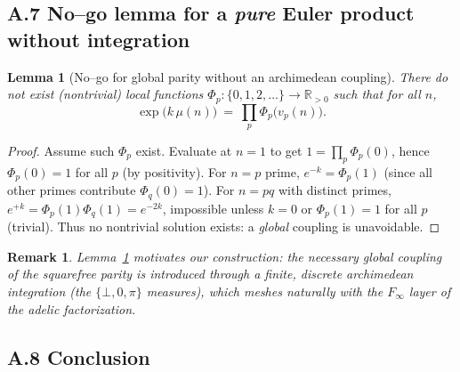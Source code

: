 \documentclass[12pt]{article}
\newtheorem{lemma}[theorem]{Lemma}
\newtheorem{remark}[theorem]{Remark}
\numberwithin{equation}{section}
\begin{document}
\bigskip
\subsection*{A.7 \; No–go lemma for a \emph{pure} Euler product without integration}

\begin{lemma}[No–go for global parity without an archimedean coupling]\label{lem:nogo}
There do not exist (nontrivial) local functions $\Phi_p:\{0,1,2,\ldots\}\to\mathbb{R}_{>0}$ such that for all $n$,
\[
\exp\!\big(k\,\mu(n)\big)\ =\ \prod_{p}\Phi_p\big(v_p(n)\big).
\]
\end{lemma}

\begin{proof}
Assume such $\Phi_p$ exist. Evaluate at $n=1$ to get $1=\prod_p \Phi_p(0)$, hence $\Phi_p(0)=1$ for all $p$ (by positivity).
For $n=p$ prime, $e^{-k}=\Phi_p(1)$ (since all other primes contribute $\Phi_q(0)=1$).
For $n=pq$ with distinct primes, $e^{+k}=\Phi_p(1)\Phi_q(1)=e^{-2k}$, impossible unless $k=0$ or $\Phi_p(1)=1$ for all $p$ (trivial). Thus no nontrivial solution exists: a \emph{global} coupling is unavoidable.
\end{proof}

\begin{remark}
Lemma~\ref{lem:nogo} motivates our construction: the necessary global coupling of the squarefree parity is introduced through a finite, discrete archimedean integration (the $\{\bot,0,\pi\}$ measures), which meshes naturally with the $F_\infty$ layer of the adelic factorization.
\end{remark}

\bigskip
\subsection*{A.8 \; Conclusion}
\end{document}
